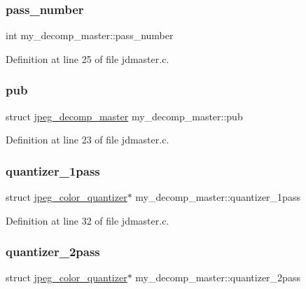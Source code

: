 \subsubsection{\texorpdfstring{pass\_number}{pass\_number}}
{\footnotesize\ttfamily int my\+\_\+decomp\+\_\+master\+::pass\+\_\+number}



Definition at line 25 of file jdmaster.\+c.

\mbox{\label{structmy__decomp__master_ab9a692c30b5f1cc03d9074ad3c69af3f}} 
\subsubsection{\texorpdfstring{pub}{pub}}
{\footnotesize\ttfamily struct \mbox{\hyperlink{structjpeg__decomp__master}{jpeg\+\_\+decomp\+\_\+master}} my\+\_\+decomp\+\_\+master\+::pub}



Definition at line 23 of file jdmaster.\+c.

\mbox{\label{structmy__decomp__master_af72048ba84933f931c09153470ff4f0b}} 
\subsubsection{\texorpdfstring{quantizer\_1pass}{quantizer\_1pass}}
{\footnotesize\ttfamily struct \mbox{\hyperlink{structjpeg__color__quantizer}{jpeg\+\_\+color\+\_\+quantizer}}$\ast$ my\+\_\+decomp\+\_\+master\+::quantizer\+\_\+1pass}



Definition at line 32 of file jdmaster.\+c.

\mbox{\label{structmy__decomp__master_a9a5f56ccbaec7d13e08e0cfb9d7a3974}} 
\subsubsection{\texorpdfstring{quantizer\_2pass}{quantizer\_2pass}}
{\footnotesize\ttfamily struct \mbox{\hyperlink{structjpeg__color__quantizer}{jpeg\+\_\+color\+\_\+quantizer}}$\ast$ my\+\_\+decomp\+\_\+master\+::quantizer\+\_\+2pass}



